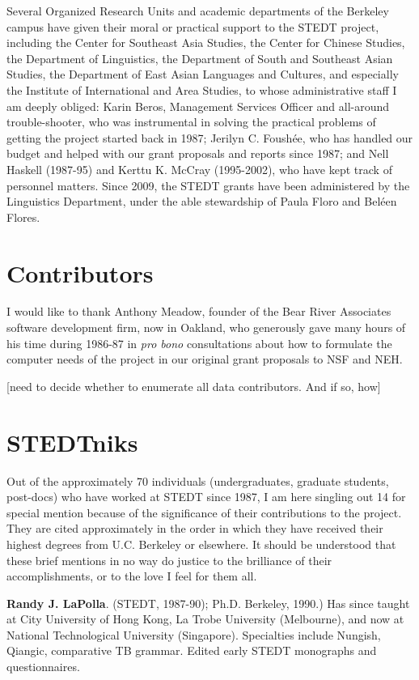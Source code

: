 Several Organized Research Units and academic departments of the Berkeley campus have given their moral or practical support to the STEDT project, including the Center for Southeast Asia Studies, the Center for Chinese Studies, the Department of Linguistics, the Department of South and Southeast Asian Studies, the Department of East Asian Languages and Cultures, and especially the Institute of International and Area Studies, to whose administrative staff I am deeply obliged: Karin Beros, Management Services Officer and all-around trouble-shooter, who was instrumental in solving the practical problems of getting the project started back in 1987; Jerilyn C. Foush\'ee, who has handled our budget and helped with our grant proposals and reports since 1987; and Nell Haskell (1987-95) and Kerttu K. McCray (1995-2002), who have kept track of personnel matters.  Since 2009, the STEDT grants have been administered by the Linguistics Department, under the able stewardship of Paula Floro and Bel\'een Flores.

\section{Contributors}

I would like to thank Anthony Meadow, founder of the Bear River Associates software development firm, now in Oakland, who generously gave many hours of his time during 1986-87 in {\it pro bono} consultations about how to formulate the computer needs of the project in our original grant proposals to NSF and NEH. 

[need to decide whether to enumerate all data contributors. And if so, how]

\section{STEDTniks}

Out of the approximately 70 individuals (undergraduates, graduate students, post-docs) who have worked at STEDT since 1987, I am here singling out 14 for special mention because of the significance of their contributions to the project. They are cited approximately in the order in which they have received their highest degrees from U.C. Berkeley or elsewhere. It should be understood that these brief mentions in no way do justice to the brilliance of their accomplishments, or to the love I feel for them all.

\textbf{Randy J. LaPolla}. (STEDT, 1987-90); Ph.D. Berkeley, 1990.) Has since taught at City University of Hong Kong, La Trobe University (Melbourne), and now at National Technological University (Singapore). Specialties include Nungish, Qiangic, comparative TB grammar. Edited early STEDT monographs and questionnaires.

